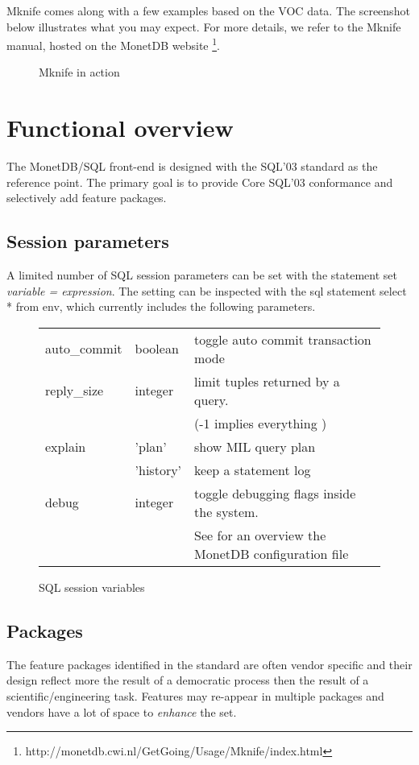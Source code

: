 \documentclass[10pt,twocolumn,fleqn]{article}
\begin{document}
Mknife comes along with a few examples based on the VOC
data. The screenshot below illustrates what you may expect.
For more details, we refer to the Mknife manual, hosted on
the
MonetDB website \footnote{http://monetdb.cwi.nl/GetGoing/Usage/Mknife/index.html}.

\begin{figure*}
\begin{center}
\caption{Mknife in action }
\end{center}
\end{figure*}


\section{Functional overview}
\label{Functionality}
The MonetDB/SQL front-end is designed with the SQL'03 standard as the reference
point. The primary goal is to provide Core SQL'03 conformance and
selectively add feature packages.

\subsection*{Session parameters}
A limited number of SQL session parameters can be set with the
statement {\sc set} {\em variable = expression}.
The setting can be inspected with the {\sc sql} statement
{\sc select} * {\sc from} env, which currently includes
the following parameters.
\begin{figure*}
\begin{tabular}{ll l}
auto\_commit & boolean & toggle auto commit transaction mode\\
reply\_size & integer & limit tuples returned by a query.\\
	&& (-1 implies everything )\\
explain & 'plan' & show MIL query plan\\
	& 'history' & keep a statement log \\
debug & integer & toggle debugging flags inside the system.\\
 && See for an overview the MonetDB configuration file\\
\end{tabular}
\caption{SQL session variables}
\end{figure*}

\subsection*{Packages}
The feature packages identified in the standard are often vendor specific
and their design reflect more the result of a democratic process then
the result of a scientific/engineering task.
Features may re-appear in multiple packages and vendors have a lot of
space to {\em enhance} the set.
\end{document}
